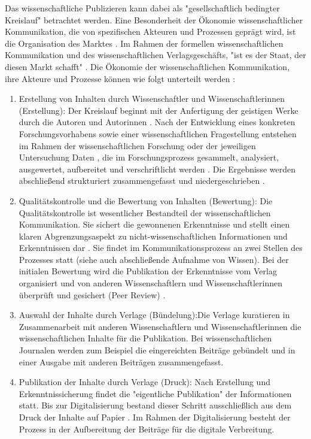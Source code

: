 Das wissenschaftliche Publizieren kann dabei als "gesellschaftlich bedingter Kreislauf" \cite{schirmbacher_2009_wisspub} betrachtet werden. Eine Besonderheit der Ökonomie wissenschaftlicher Kommunikation, die von spezifischen Akteuren und Prozessen geprägt wird, ist die Organisation des Marktes \cite{Hess_2006}. Im Rahmen der formellen wissenschaftlichen Kommunikation und des wissenschaftlichen Verlagsgeschäfts, "ist es der Staat, der diesen Markt schafft" \cite{Hirschi_2015_buch_oa}. Die Ökonomie der wissenschaftlichen Kommunikation, ihre Akteure und Prozesse können wie folgt unterteilt werden \cite{cite:11b} \cite{Hess_2006}:
\begin{enumerate}
\item Erstellung von Inhalten durch Wissenschaftler und Wissenschaftlerinnen (Erstellung): Der Kreislauf beginnt mit der Anfertigung der geistigen Werke durch die Autoren und Autorinnen \cite{schirmbacher_2009_wisspub}. Nach der Entwicklung eines konkreten Forschungsvorhabens sowie einer wissenschaftlichen Fragestellung entstehen im Rahmen der wissenschaftlichen Forschung oder der jeweiligen Untersuchung Daten \cite{cite:11c}, die im Forschungsprozess gesammelt, analysiert, ausgewertet, aufbereitet und verschriftlicht werden \cite{cite:11d}. Die Ergebnisse werden abschließend strukturiert zusammengefasst und niedergeschrieben \cite{Hess_2006}.
\item Qualitätskontrolle und die Bewertung von Inhalten (Bewertung): Die Qualitätskontrolle ist wesentlicher Bestandteil der wissenschaftlichen Kommunikation. Sie sichert die gewonnenen Erkenntnisse \cite{cite:11e} und stellt einen klaren Abgrenzungsaspekt zu nicht-wissenschaftlichen Informationen und Erkenntnissen dar \cite{cite:11f}. Sie findet im Kommunikationsprozess an zwei Stellen des Prozesses statt (siehe auch abschließende Aufnahme von Wissen). Bei der initialen Bewertung wird die Publikation der Erkenntnisse vom Verlag organisiert \cite{schirmbacher_2009_wisspub} und von anderen Wissenschaftlern und Wissenschaftlerinnen überprüft und gesichert (Peer Review) \cite{Hess_2006}.
\item Auswahl der Inhalte durch Verlage (Bündelung):Die Verlage kuratieren in Zusammenarbeit mit anderen Wissenschaftlern und Wissenschaftlerinnen die wissenschaftlichen Inhalte für die Publikation. Bei wissenschaftlichen Journalen werden zum Beispiel die eingereichten Beiträge gebündelt und in einer Ausgabe mit anderen Beiträgen zusammengefasst.
\item Publikation der Inhalte durch Verlage (Druck): Nach Erstellung und Erkenntnissicherung findet die "eigentliche Publikation" \cite{schirmbacher_2009_wisspub} der Informationen statt. Bis zur Digitalisierung bestand dieser Schritt ausschließlich aus dem Druck der Inhalte auf Papier \cite{cite:11h}. Im Rahmen der Digitalisierung besteht der Prozess in der Aufbereitung der Beiträge für die digitale Verbreitung.

\end{enumerate}
